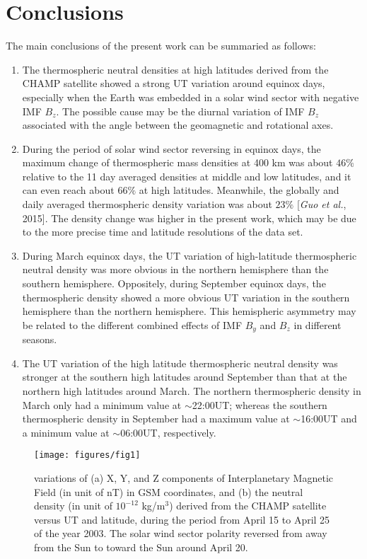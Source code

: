\documentclass[12pt,a4paper]{article}
\begin{document}
\section{Conclusions}
The main conclusions of the present work can be summaried as follows:
\begin{enumerate}
    \item The thermospheric neutral densities at high latitudes derived from the CHAMP satellite showed a strong UT variation around equinox days, especially when the Earth was embedded in a solar wind sector with negative IMF $B_z$. The possible cause may be the diurnal variation of IMF $B_z$ associated with the angle between the geomagnetic and rotational axes.
    \item During the period of solar wind sector reversing in equinox days, the maximum change of thermospheric mass densities at 400 km was about $46\%$ relative to the 11 day averaged densities at  middle and low  latitudes, and it  can even reach about $66\%$ at high latitudes. Meanwhile, the globally and daily averaged thermospheric density variation was about $23\%$ [\textsl{Guo et al.}, 2015]. The density change was higher in the present work, which may be due to the more precise time and latitude resolutions of the data set.
    \item During March equinox days, the UT variation of high-latitude thermospheric neutral density was more obvious in the northern hemisphere than the southern hemisphere. Oppositely, during September equinox days, the thermospheric density showed a more obvious UT variation in the southern hemisphere than the northern hemisphere. This hemispheric asymmetry may be related to the different combined effects of IMF $B_y$ and $B_z$ in different seasons.
    \item The UT variation of the high latitude thermospheric neutral density was stronger at the southern high latitudes around September than that at the northern high latitudes around March. The northern thermospheric density in March only had a minimum value at $\sim$22:00UT; whereas the southern thermospheric density in September had a maximum value at $\sim$16:00UT and a minimum value at $\sim$06:00UT, respectively.
\end{enumerate}

\newpage
\begin{figure}[!ht]
    \begin{center}
        \texttt{[image: figures/fig1]}
        \caption{variations of (a) X, Y, and Z components of Interplanetary Magnetic Field (in unit of nT) in GSM coordinates, and (b) the neutral density (in unit of $10^{-12}$ kg/m$^3$) derived from the CHAMP satellite versus UT and latitude, during the period from April 15 to April 25 of the year 2003. The solar wind sector polarity reversed from away from the Sun to toward the Sun around April 20.} 
        \label{fig1}
    \end{center}
\end{figure}
\newpage
\end{document}
